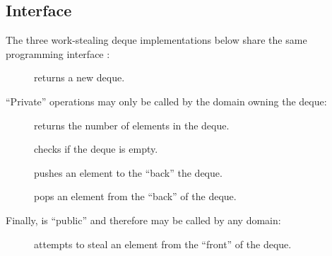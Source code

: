 \subsection{Interface}

The three work-stealing deque implementations below share the same programming interface :

\begin{description}
\item[] returns a new deque.
\end{description}

\noindent ``Private'' operations may only be called by the domain owning the deque:
\begin{description}
\item[] returns the number of elements in the deque.

\item[] checks if the deque is empty.

\item[] pushes an element to the ``back'' the deque.

\item[] pops an element from the ``back'' of the deque.
\end{description}

\noindent Finally,  is ``public'' and therefore may be called by any domain:
\begin{description}
\item[] attempts to steal
  an element from the ``front'' of the deque.
\end{description}
